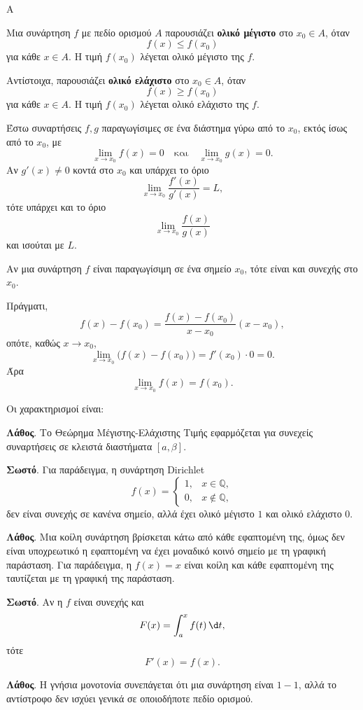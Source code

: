 \begin{thema}{Α}
\begin{erwthma}
\item Μια συνάρτηση $f$ με πεδίο ορισμού $A$ παρουσιάζει \textbf{ολικό μέγιστο} στο $x_0\in A$, όταν
\[
f(x)\leq f(x_0)
\]
για κάθε $x\in A$. Η τιμή $f(x_0)$ λέγεται ολικό μέγιστο της $f$.

Αντίστοιχα, παρουσιάζει \textbf{ολικό ελάχιστο} στο $x_0\in A$, όταν
\[
f(x)\geq f(x_0)
\]
για κάθε $x\in A$. Η τιμή $f(x_0)$ λέγεται ολικό ελάχιστο της $f$.

\item Έστω συναρτήσεις $f,g$ παραγωγίσιμες σε ένα διάστημα γύρω από το $x_0$, εκτός ίσως από το $x_0$, με
\[
\lim_{x\to x_0}f(x)=0
\quad\text{και}\quad
\lim_{x\to x_0}g(x)=0.
\]
Αν $g'(x)\neq0$ κοντά στο $x_0$ και υπάρχει το όριο
\[
\lim_{x\to x_0}\frac{f'(x)}{g'(x)}=L,
\]
τότε υπάρχει και το όριο
\[
\lim_{x\to x_0}\frac{f(x)}{g(x)}
\]
και ισούται με $L$.

\item Αν μια συνάρτηση $f$ είναι παραγωγίσιμη σε ένα σημείο $x_0$, τότε είναι και συνεχής στο $x_0$.

Πράγματι,
\[
f(x)-f(x_0)=\frac{f(x)-f(x_0)}{x-x_0}(x-x_0),
\]
οπότε, καθώς $x\to x_0$,
\[
\lim_{x\to x_0}\bigl(f(x)-f(x_0)\bigr)=f'(x_0)\cdot0=0.
\]
Άρα
\[
\lim_{x\to x_0}f(x)=f(x_0).
\]

\item Οι χαρακτηρισμοί είναι:
\begin{alist}
\item \textbf{Λάθος}. Το Θεώρημα Μέγιστης-Ελάχιστης Τιμής εφαρμόζεται για συνεχείς συναρτήσεις σε κλειστά διαστήματα $[a,\beta]$.
\item \textbf{Σωστό}. Για παράδειγμα, η συνάρτηση Dirichlet
\[
f(x)=
\begin{cases}
1,&x\in\mathbb{Q},\\
0,&x\notin\mathbb{Q},
\end{cases}
\]
δεν είναι συνεχής σε κανένα σημείο, αλλά έχει ολικό μέγιστο $1$ και ολικό ελάχιστο $0$.
\item \textbf{Λάθος}. Μια κοίλη συνάρτηση βρίσκεται κάτω από κάθε εφαπτομένη της, όμως δεν είναι υποχρεωτικό η εφαπτομένη να έχει μοναδικό κοινό σημείο με τη γραφική παράσταση. Για παράδειγμα, η $f(x)=x$ είναι κοίλη και κάθε εφαπτομένη της ταυτίζεται με τη γραφική της παράσταση.
\item \textbf{Σωστό}. Αν η $f$ είναι συνεχής και
\[
F(x)=\dint_a^x f(t)\,\d t,
\]
τότε
\[
F'(x)=f(x).
\]
\item \textbf{Λάθος}. Η γνήσια μονοτονία συνεπάγεται ότι μια συνάρτηση είναι $1-1$, αλλά το αντίστροφο δεν ισχύει γενικά σε οποιοδήποτε πεδίο ορισμού.
\end{alist}
\end{erwthma}
\end{thema}

